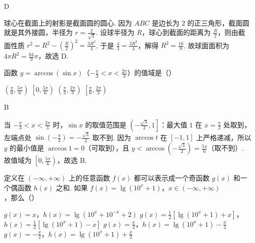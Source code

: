 \documentclass[UTF8,a4paper,oneside,11pt]{ctexbook}
\begin{document}
\begin{answer}
D
\end{answer}

\begin{solution}
球心在截面上的射影是截面圆的圆心. 因为 \(ABC\) 是边长为 \(2\) 的正三角形，截面圆就是其外接圆，半径为 \(r = \frac{2}{\sqrt{3}}\). 设球半径为 \(R\)，球心到截面的距离为 \(\frac{R}{2}\)，则由截面性质 \(r^2 = R^2 - \left(\frac{R}{2}\right)^2 = \frac{3R^2}{4}\). 于是 \(\frac{4}{3} = \frac{3R^2}{4}\)，解得 \(R^2 = \frac{16}{9}\). 故球面面积为 \(4\pi R^2 = \frac{64}{9}\pi\)，故选 D.
\end{solution}

\begin{problem}
函数 \(y = \arccos \left(\sin x\right)\)（\(-\frac{\pi}{3} < x < \frac{2\pi}{3}\)）的值域是（\quad）

\choices
    {\(\left(\frac{\pi}{6}, \frac{5\pi}{6}\right)\)}
    {\(\left[0, \frac{5\pi}{6}\right)\)}
    {\(\left(\frac{\pi}{3}, \frac{2\pi}{3}\right)\)}
    {\(\left[\frac{\pi}{6}, \frac{2\pi}{3}\right)\)}
\end{problem}

\begin{answer}
B
\end{answer}

\begin{solution}
当 \(-\frac{\pi}{3} < x < \frac{2\pi}{3}\) 时，\(\sin x\) 的取值范围是 \(\left(-\frac{\sqrt{3}}{2}, 1\right]\)：最大值 \(1\) 在 \(x = \frac{\pi}{2}\) 处取到，左端点处 \(\sin \left(-\frac{\pi}{3}\right) = -\frac{\sqrt{3}}{2}\) 取不到. 因为 \(\arccos t\) 在 \([-1, 1]\) 上严格递减，所以 \(y\) 的最小值是 \(\arccos 1 = 0\)（可取到），且 \(y < \arccos \left(-\frac{\sqrt{3}}{2}\right) = \frac{5\pi}{6}\)（取不到）. 故值域为 \(\left[0, \frac{5\pi}{6}\right)\)，故选 B.
\end{solution}

\begin{problem}
定义在 \((- \infty, + \infty)\) 上的任意函数 \(f(x)\) 都可以表示成一个奇函数 \(g(x)\) 和一个偶函数 \(h(x)\) 之和. 如果 \(f(x) = \lg \left(10^x + 1\right)\)，\(x \in (-\infty, +\infty)\)，那么（\quad）

\choices
    {\(g(x) = x\)，\(h(x) = \lg \left(10^x + 10^{-x} + 2\right)\)}
    {\(g(x) = \frac{1}{2}\left[\lg \left(10^x + 1\right) + x\right]\)，\(h(x) = \frac{1}{2}\left[\lg \left(10^x + 1\right) - x\right]\)}
    {\(g(x) = \frac{x}{2}\)，\(h(x) = \lg \left(10^x + 1\right) - \frac{x}{2}\)}
    {\(g(x) = -\frac{x}{2}\)，\(h(x) = \lg \left(10^x + 1\right) + \frac{x}{2}\)}
\end{problem}
\end{document}

